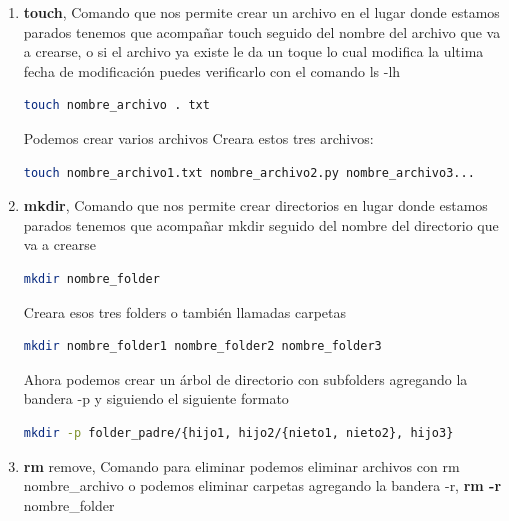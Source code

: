 \begin{enumerate}
\begin{lstlisting}[language=bash]
cd Documents
\end{lstlisting}
Entraríamos a la carpeta Documents y si escribimos pwd nos debería decir que ahora estamos en /home/titor/Documents
\begin{lstlisting}[language=bash]
cd Documents
\end{lstlisting}
También podemos ingresar cada ves mas adentro acoplando el nombre de la carpeta seguido del símbolo / ejemplo:
\begin{lstlisting}[language=bash]
cd Documents / carpeta_1 / carpeta_2 / capeta_3
\end{lstlisting}
\item \textbf{touch}, Comando que nos permite crear un archivo en el lugar donde estamos parados tenemos que acompañar touch seguido del nombre del archivo que va a crearse, o si el archivo ya existe le da un toque lo cual modifica la ultima fecha de modificación puedes verificarlo con el comando ls -lh
\begin{lstlisting}[language=bash]
touch nombre_archivo . txt
\end{lstlisting}
Podemos crear varios archivos Creara estos tres archivos:
\begin{lstlisting}[language=bash]
touch nombre_archivo1.txt nombre_archivo2.py nombre_archivo3...
\end{lstlisting}
\item \textbf{mkdir}, Comando que nos permite crear directorios en lugar donde estamos parados tenemos que acompañar mkdir seguido del nombre del directorio que va a crearse
\begin{lstlisting}[language=bash]
mkdir nombre_folder
\end{lstlisting}
Creara esos tres folders o también llamadas carpetas
\begin{lstlisting}[language=bash]
mkdir nombre_folder1 nombre_folder2 nombre_folder3
\end{lstlisting}
Ahora podemos crear un árbol de directorio con subfolders agregando la bandera
-p y siguiendo el siguiente formato
\begin{lstlisting}[language=bash]
mkdir -p folder_padre/{hijo1, hijo2/{nieto1, nieto2}, hijo3}
\end{lstlisting}
\item \textbf{rm} remove, Comando para eliminar podemos eliminar archivos con rm nombre\_archivo o podemos eliminar carpetas agregando la bandera -r, \textbf{rm -r} nombre\_folder
\begin{lstlisting}[language=bash]

\end{lstlisting}
\end{enumerate}
